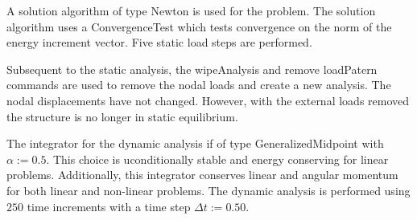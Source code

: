 \documentclass[12pt]{article}
\begin{document}
A solution algorithm of type Newton is used for the 
problem. The solution algorithm uses a ConvergenceTest which tests
convergence on the norm of the energy increment vector. 
Five static load steps are performed.

Subsequent to the static analysis, the wipeAnalysis and 
remove loadPatern commands are used 
to remove the nodal loads and create a new analysis.  The nodal 
displacements have not changed.  However, with the external loads removed
the structure is no longer in static equilibrium.

The integrator for the dynamic analysis if of type 
GeneralizedMidpoint with $\alpha := 0.5$.  This choice 
is uconditionally stable and energy conserving for linear problems.
Additionally, this integrator conserves linear and
angular momentum for both linear and non-linear problems.
The dynamic analysis is performed using $250$ time increments with
a time step $\Delta t := 0.50$.
\end{document}
